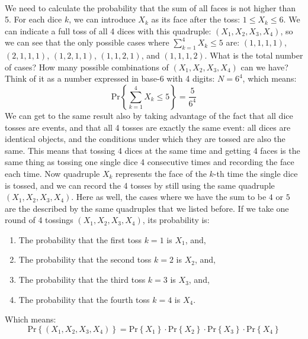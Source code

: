 \paragraph{}
We need to calculate the probability that the sum of all faces
is not higher than 5.
For each dice $k$, we can introduce $X_k$ as its face after the toss: $1 \leq X_k \leq 6$.
We can indicate a full toss of all 4 dices with
this quadruple: $(X_1,X_2,X_3,X_4)$, so we can see that the only possible cases where
$\sum_{k=1}^4 X_k \leq 5$ are: $(1,1,1,1)$, $(2,1,1,1)$, $(1,2,1,1)$, $(1,1,2,1)$, and $(1,1,1,2)$.
What is the total number of cases? How many possible combinations of $(X_1,X_2,X_3,X_4)$
can we have? Think of it as a number expressed in base-6 with 4 digits: $N=6^4$, which means:
\begin{equation*}
    \text{Pr}\left\{ \sum_{k=1}^4 X_k \leq 5 \right\} = \frac{5}{6^4}
\end{equation*}
We can get to the same result also by taking advantage of the fact that
all dice tosses are  events, and
that all 4 tosses are exactly the same event:
all dices are identical objects, and the conditions under which they are tossed are also the same.
This means that tossing 4 dices at the same time and getting 4 faces is the
same thing as tossing one single dice 4 consecutive times and recording the face each time.
Now quadruple $X_k$ represents the face of the $k$-th time the single dice is tossed,
and we can record the 4 tosses by still using the same quadruple $(X_1,X_2,X_3,X_4)$.
Here as well, the cases where we have the sum to be $4$ or $5$ are the described by
the same quadruples that we listed before. If we take one round of 4 tossings
$(X_1,X_2,X_3,X_4)$, its probability is:
\begin{enumerate}
    \item The probability that the first toss $k=1$ is $X_1$, and,
    \item The probability that the second toss $k=2$ is $X_2$, and,
    \item The probability that the third toss $k=3$ is $X_3$, and,
    \item The probability that the fourth toss $k=4$ is $X_4$.
\end{enumerate}
Which means:
\begin{equation*}
    \text{Pr}\left\{ (X_1,X_2,X_3,X_4) \right\} = \text{Pr}\left\{ X_1 \right\} \cdot
        \text{Pr}\left\{ X_2 \right\} \cdot
        \text{Pr}\left\{ X_3 \right\} \cdot
        \text{Pr}\left\{ X_4 \right\}
\end{equation*}
